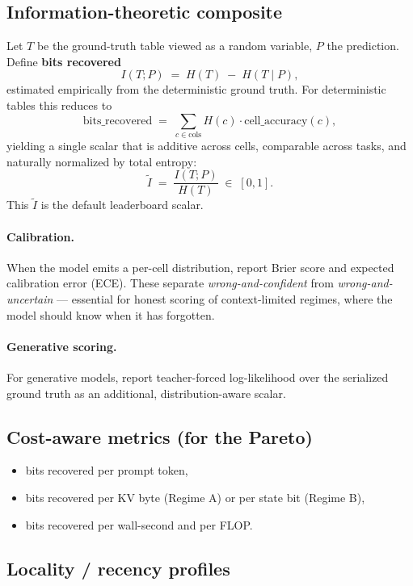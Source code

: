 \documentclass[11pt]{article}
\begin{document}
\subsection{Information-theoretic composite}

Let $T$ be the ground-truth table viewed as a random variable, $P$ the
prediction. Define \textbf{bits recovered}
\[
  I(T; P) \;=\; H(T) \;-\; H(T \mid P),
\]
estimated empirically from the deterministic ground truth. For
deterministic tables this reduces to
\[
  \mathrm{bits\_recovered} \;=\; \sum_{c \in \text{cols}}
    H(c) \cdot \mathrm{cell\_accuracy}(c),
\]
yielding a single scalar that is additive across cells, comparable
across tasks, and naturally normalized by total entropy:
\[
  \tilde{I} \;=\; \frac{I(T;P)}{H(T)} \;\in\; [0, 1].
\]
This $\tilde{I}$ is the default leaderboard scalar.

\paragraph{Calibration.}
When the model emits a per-cell distribution, report Brier score and
expected calibration error (ECE). These separate
\emph{wrong-and-confident} from \emph{wrong-and-uncertain} ---
essential for honest scoring of context-limited regimes, where the model
should know when it has forgotten.

\paragraph{Generative scoring.}
For generative models, report teacher-forced log-likelihood over the
serialized ground truth as an additional, distribution-aware scalar.

\subsection{Cost-aware metrics (for the Pareto)}

\begin{itemize}[leftmargin=*]
  \item bits recovered per prompt token,
  \item bits recovered per KV byte (Regime A) or per state bit (Regime B),
  \item bits recovered per wall-second and per FLOP.
\end{itemize}

\subsection{Locality / recency profiles}
\end{document}
